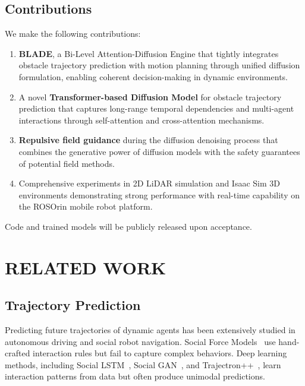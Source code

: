 \documentclass[letterpaper, 10 pt, conference]{ieeeconf}
\begin{document}
\subsection{Contributions}

We make the following contributions:

\begin{enumerate}
    \item \textbf{BLADE}, a Bi-Level Attention-Diffusion Engine that tightly integrates obstacle trajectory prediction with motion planning through unified diffusion formulation, enabling coherent decision-making in dynamic environments.
    
    \item A novel \textbf{Transformer-based Diffusion Model} for obstacle trajectory prediction that captures long-range temporal dependencies and multi-agent interactions through self-attention and cross-attention mechanisms.
    
    \item \textbf{Repulsive field guidance} during the diffusion denoising process that combines the generative power of diffusion models with the safety guarantees of potential field methods.
    
    \item Comprehensive experiments in 2D LiDAR simulation and Isaac Sim 3D environments demonstrating strong performance with real-time capability on the ROSOrin mobile robot platform.
\end{enumerate}

\noindent Code and trained models will be publicly released upon acceptance.

\section{RELATED WORK}

\subsection{Trajectory Prediction}

Predicting future trajectories of dynamic agents has been extensively studied in autonomous driving and social robot navigation. Social Force Models~\cite{helbing1995social} use hand-crafted interaction rules but fail to capture complex behaviors. Deep learning methods, including Social LSTM~\cite{alahi2016social}, Social GAN~\cite{gupta2018social}, and Trajectron++~\cite{salzmann2020trajectron++}, learn interaction patterns from data but often produce unimodal predictions.
\end{document}

